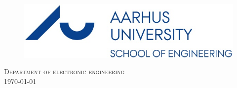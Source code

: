 \begin{center}
\vspace{5cm}


\begin{figure}[H]
\centering
\includegraphics[scale=.5]{billeder/au-ingenioerhoejskolen_en}
\end{figure}

\vfill
\textsc{\large Department of electronic engineering}\\[0.5cm]

{\large \today}\\[3cm] %
\end{center}
 